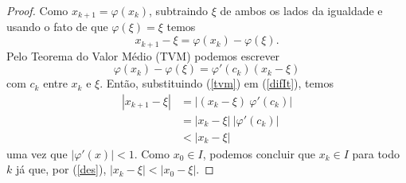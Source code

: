 \begin{proof}
Como $x_{k+1} = \varphi(x_k)$, subtraindo $\xi$ de ambos os lados da igualdade e usando o fato de que $\varphi(\xi)=\xi$ temos
    \begin{equation}\label{difIt}
        x_{k+1} - \xi = \varphi(x_k) - \varphi(\xi).
    \end{equation}
    Pelo Teorema do Valor Médio (TVM) podemos escrever \\
    \begin{equation}\label{tvm}
        \varphi(x_k) - \varphi(\xi) = \varphi'(c_k) (x_k - \xi)
    \end{equation}
    com $c_k$ entre $x_k$ e $\xi$. Então, substituindo (\ref{tvm}) em (\ref{difIt}), temos
    \begin{align}\label{des}
        |x_{k+1} - \xi| &= |(x_k - \xi) \ \varphi'(c_k)| \nonumber \\
        &= |x_k - \xi| \ |\varphi'(c_k)| \\
        &< |x_k - \xi| \nonumber
    \end{align}
    uma vez que $|\varphi'(x)| < 1$. Como $x_0 \in I$, podemos concluir que $x_k \in I$ para todo $k$ já que, por (\ref{des}), $|x_k - \xi| < |x_0 - \xi|$. 


\end{proof}
